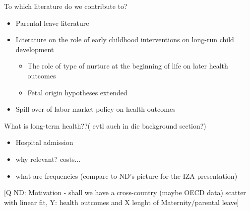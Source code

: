 \documentclass[11pt, a4paper,draft]{article} %
\begin{document}
To which literature do we contribute to?
\begin{itemize}
  \item Parental leave literature
  \item Literature on the role of early childhood interventions on long-run child development
  \begin{itemize}
    \item The role of type of nurture at the beginning of life on later health outcomes
    \item Fetal origin hypotheses extended
  \end{itemize}
  \item Spill-over of labor market policy on health outcomes
\end{itemize}

What is long-term health??( evtl auch in die background section?) 
\begin{itemize}
	\item Hospital admission
	\item why relevant? costs...
	\item what are frequencies (compare to ND's picture for the IZA presentation)
\end{itemize}

[Q ND: Motivation - shall we have a cross-country (maybe OECD data) scatter with linear fit, Y: health outcomes and X lenght of Maternity/parental leave]

\newpage
\end{document}
